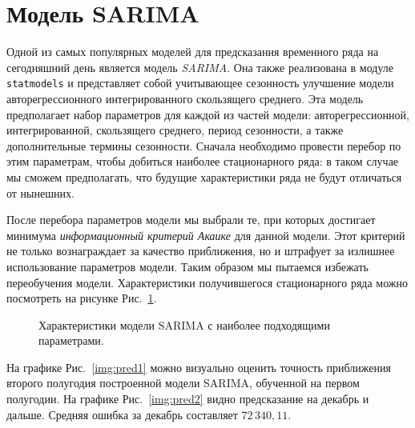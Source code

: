 \section{Модель SARIMA}

Одной из самых популярных моделей для предсказания временного ряда на сегодняшний день является модель \textit{SARIMA}. Она также реализована в модуле \texttt{statmodels} и представляет собой учитывающее сезонность улучшение модели авторегрессионного интегрированного скользящего среднего. Эта модель предполагает набор параметров для каждой из частей модели: авторегрессионной, интегрированной, скользящего среднего, период сезонности, а также дополнительные термины сезонности. Сначала необходимо провести перебор по этим параметрам, чтобы добиться наиболее стационарного ряда: в таком случае мы сможем предполагать, что будущие характеристики ряда не будут отличаться от нынешних.

После перебора параметров модели мы выбрали те, при которых достигает минимума \textit{информационный критерий Акаике} для данной модели. Этот критерий не только вознаграждает за качество приближения, но и штрафует за излишнее использование параметров модели. Таким образом мы пытаемся избежать переобучения модели. Характеристики получившегося стационарного ряда можно посмотреть на рисунке Рис.~\ref{img:diagn}.

\begin{figure}[h]
        \noindent{}
        \caption{Характеристики модели SARIMA с наиболее подходящими параметрами.}
        \label{img:diagn}
\end{figure}

На графике Рис.~\ref{img:pred1} можно визуально оценить точность приближения второго полугодия построенной модели SARIMA, обученной на первом полугодии. На графике Рис.~\ref{img:pred2} видно предсказание на декабрь и дальше. Средняя ошибка за декабрь составляет
$
        72\,340,\!11.
$

